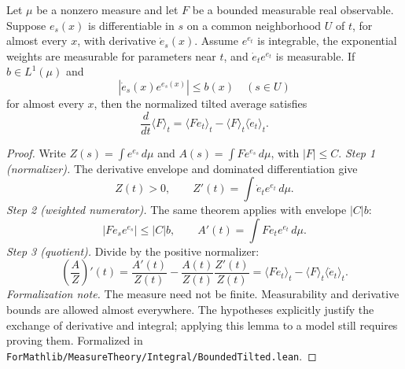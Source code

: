 \begin{lemma}\label{lem:sg-tal:perceptron-tilted-response}
  \leanok
{}
Let $\mu$ be a nonzero measure and let $F$ be a bounded measurable real observable.
Suppose $e_s(x)$ is differentiable in $s$ on a common neighborhood $U$ of $t$, for almost every
$x$, with derivative $\dot e_s(x)$. Assume $e^{e_t}$ is integrable, the exponential weights are
measurable for parameters near $t$, and $\dot e_t e^{e_t}$ is measurable. If $b\in L^1(\mu)$ and
\[
 |\dot e_s(x)e^{e_s(x)}|\le b(x)\quad(s\in U)
\]
for almost every $x$, then the normalized tilted average satisfies
\[
 \frac{d}{dt}\langle F\rangle_t
 =\langle F\dot e_t\rangle_t-\langle F\rangle_t\langle\dot e_t\rangle_t.
\]
\end{lemma}
\begin{proof}
  \leanok
Write $Z(s)=\int e^{e_s}\,d\mu$ and $A(s)=\int F e^{e_s}\,d\mu$, with $|F|\le C$.
\emph{Step 1 (normalizer).} The derivative envelope and dominated differentiation give
\[
 Z(t)>0,\qquad Z'(t)=\int\dot e_t e^{e_t}\,d\mu.
\]
\emph{Step 2 (weighted numerator).} The same theorem applies with envelope $|C|b$:
\[
 |F\dot e_s e^{e_s}|\le|C|b,\qquad A'(t)=\int F\dot e_t e^{e_t}\,d\mu.
\]
\emph{Step 3 (quotient).} Divide by the positive normalizer:
\[
 \left(\frac{A}{Z}\right)'(t)
 =\frac{A'(t)}{Z(t)}-\frac{A(t)}{Z(t)}\frac{Z'(t)}{Z(t)}
 =\langle F\dot e_t\rangle_t-\langle F\rangle_t\langle\dot e_t\rangle_t.
\]
\emph{Formalization note.} The measure need not be finite. Measurability and derivative bounds
are allowed almost everywhere. The hypotheses explicitly justify the exchange of derivative
and integral; applying this lemma to a model still requires proving them.
Formalized in \texttt{ForMathlib/MeasureTheory/Integral/BoundedTilted.lean}.
\end{proof}

